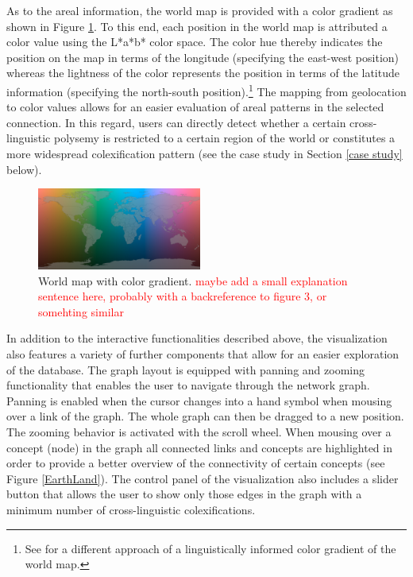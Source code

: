 As to the areal information, the world map is provided with a color gradient as shown in Figure \ref{World map}. To this end, each position in the world map is attributed a color value using the L*a*b* color space. The color hue thereby indicates the position on the map in terms of the longitude (specifying the east-west position) whereas the lightness of the color represents the position in terms of the latitude information (specifying the north-south position).\footnote{See  for a different approach of a linguistically informed color gradient of the world map.}
The mapping from geolocation to color values allows for an easier evaluation of areal patterns in the selected connection. In this regard, users can directly detect whether a certain cross-linguistic polysemy is restricted to a certain region of the world or constitutes a more widespread colexification pattern (see the case study in Section \ref{case study} below).

\begin{figure}[htbp]
\begin{center}
\includegraphics[width=0.48\textwidth]{img/ColorScaleWorld.png}
\caption{World map with color gradient. \textcolor{red}{maybe add a small explanation sentence here,
probably with a backreference to figure 3, or somehting similar}}
\label{World map}
\end{center}
\end{figure}



In addition to the interactive functionalities described above, the visualization also features a variety of further components that allow for an easier exploration of the database. The graph layout is equipped with panning and zooming functionality that enables the user to navigate through the network graph. Panning is enabled when the cursor changes into a hand symbol when mousing over a link of the graph. The whole graph can then be dragged to a new position. The zooming behavior is activated with the scroll wheel. 
When mousing over a concept (node) in the graph all connected links and concepts are highlighted
in order to provide a better overview of the connectivity of certain concepts (see Figure \ref{EarthLand}). The control panel of the visualization also includes a slider button that allows the user to show only those edges in the graph with a minimum number of cross-linguistic colexifications. 

